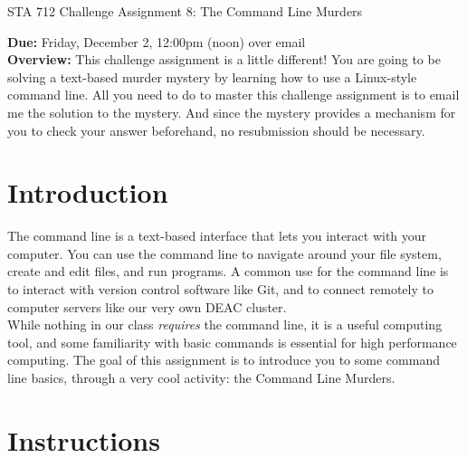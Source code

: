 \documentclass[11pt]{article}
\begin{document}
\begin{center}
\Large
STA 712 Challenge Assignment 8: The Command Line Murders\\
\normalsize
\vspace{5mm}
\end{center}

\noindent \textbf{Due:} Friday, December 2, 12:00pm (noon) over email\\ 

\noindent \textbf{Overview:} This challenge assignment is a little different! You are going to be solving a text-based murder mystery by learning how to use a Linux-style command line. All you need to do to master this challenge assignment is to email me the solution to the mystery. And since the mystery provides a mechanism for you to check your answer beforehand, no resubmission should be necessary.

\section*{Introduction}

The command line is a text-based interface that lets you interact with your computer. You can use the command line to navigate around your file system, create and edit files, and run programs. A common use for the command line is to interact with version control software like Git, and to connect remotely to computer servers like our very own DEAC cluster.\\

\noindent While nothing in our class \textit{requires} the command line, it is a useful computing tool, and some familiarity with basic commands is essential for high performance computing. The goal of this assignment is to introduce you to some command line basics, through a very cool activity: the Command Line Murders.

\section*{Instructions}
\end{document}
